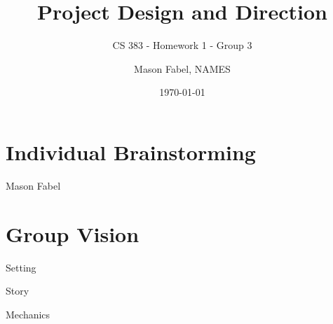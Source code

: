 \documentclass[12pt]{report}
\title{Project Design and Direction}
\subtitle{CS 383 - Homework 1 - Group 3}
\author{Mason Fabel, NAMES} %
\date{\today}
\begin{document}
\maketitle

\chapter{Individual Brainstorming}


\begin{section}{Mason Fabel}
\end{section}

\chapter{Group Vision}


\begin{section}{Setting}
\end{section}

\begin{section}{Story}
\end{section}

\begin{section}{Mechanics}
\end{section}
\end{document}
